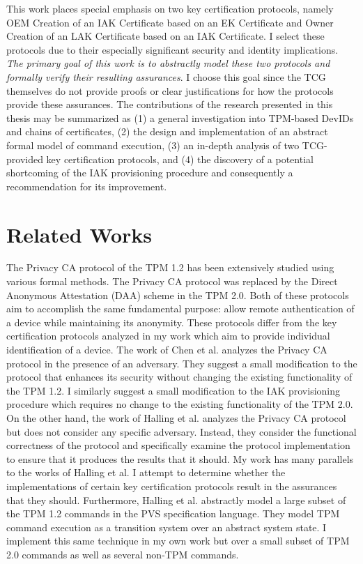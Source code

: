 This work places special emphasis on two key certification protocols, namely OEM Creation of an IAK Certificate based on an EK Certificate and Owner Creation of an LAK Certificate based on an IAK Certificate. I select these protocols due to their especially significant security and identity implications. \textit{The primary goal of this work is to abstractly model these two protocols and formally verify their resulting assurances}. I choose this goal since the TCG themselves do not provide proofs or clear justifications for how the protocols provide these assurances. 
The contributions of the research presented in this thesis may be summarized as (1) a general investigation into TPM-based DevIDs and chains of certificates, (2) the design and implementation of an abstract formal model of command execution, (3) an in-depth analysis of two TCG-provided key certification protocols, and (4) the discovery of a potential shortcoming of the IAK provisioning procedure and consequently a recommendation for its improvement.





\section{Related Works}


The Privacy CA protocol of the TPM 1.2 has been extensively studied using various formal methods. The Privacy CA protocol was replaced by the Direct Anonymous Attestation (DAA) scheme in the TPM 2.0. Both of these protocols aim to accomplish the same fundamental purpose: allow remote authentication of a device while maintaining its anonymity. These protocols differ from the key certification protocols analyzed in my work which aim to provide individual identification of a device.
The work of Chen et al. \cite{PrivacyCAAnalysis-Chen} analyzes the Privacy CA protocol in the presence of an adversary. They suggest a small modification to the protocol that enhances its security without changing the existing functionality of the TPM 1.2. I similarly suggest a small modification to the IAK provisioning procedure which requires no change to the existing functionality of the TPM 2.0.
On the other hand, the work of Halling et al. \cite{PrivacyCAAnalysis-Hall,TPM12Model} analyzes the Privacy CA protocol but does not consider any specific adversary. Instead, they consider the functional correctness of the protocol and specifically examine the protocol implementation to ensure that it produces the results that it should.  
My work has many parallels to the works of Halling et al. 
I attempt to determine whether the implementations of certain key certification protocols result in the assurances that they should.
Furthermore, Halling et al. abstractly model a large subset of the TPM 1.2 commands in the PVS specification language. They model TPM command execution as a transition system over an abstract system state. I implement this same technique in my own work but over a small subset of TPM 2.0 commands as well as several non-TPM commands. 

